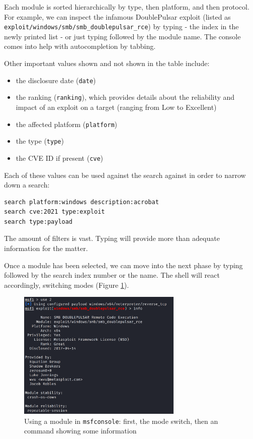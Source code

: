 Each module is sorted hierarchically by type, then platform, and then protocol. For example, we can inspect the infamous DoublePulsar exploit (listed as \texttt{exploit/windows/smb/smb\_doublepulsar\_rce}) by typing  - the index in the newly printed list - or just typing  followed by the module name. The console comes into help with autocompletion by tabbing.

Other important values shown and not shown in the table include:

\begin{itemize}
    \item the disclosure date (\texttt{date})
    \item the ranking (\texttt{ranking}), which provides details about the reliability and impact of an exploit on a target (ranging from Low to Excellent)
    \item the affected platform (\texttt{platform})
    \item the type (\texttt{type})
    \item the CVE ID if present (\texttt{cve})
\end{itemize}

Each of these values can be used against the search against in order to narrow down a search:

\begin{lstlisting}
search platform:windows description:acrobat
search cve:2021 type:exploit
search type:payload 
\end{lstlisting}

The amount of filters is vast. Typing  will provide more than adequate information for the matter.

Once a module has been selected, we can move into the next phase by typing  followed by the search index number or the name. The shell will react accordingly, switching modes (Figure \ref{fig:getting-started:using-module}).

\begin{figure}[htbp]
	\centering
	\includegraphics[width=0.7\textwidth]{../drawable/preliminaries_screenshots/info-eternalblue.png}
    \caption{Using a module in \texttt{msfconsole}: first, the mode switch, then an  command showing some information}
    \label{fig:getting-started:using-module}
\end{figure}

